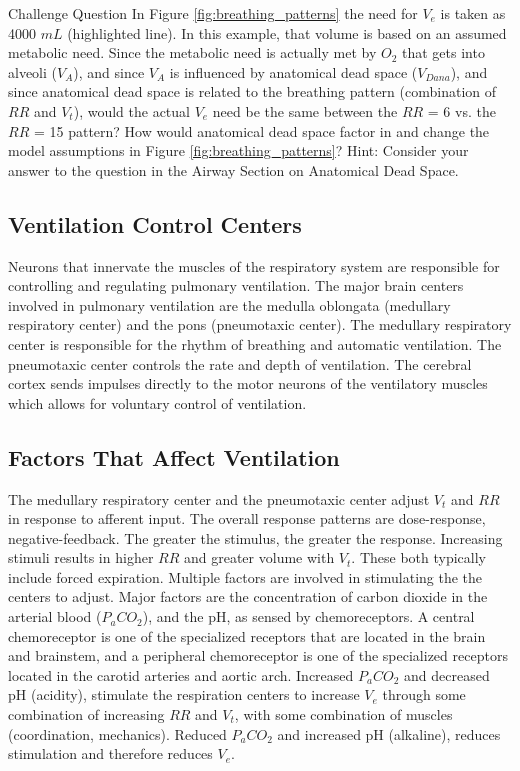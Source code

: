 \begin{question}{Challenge Question}
In Figure \ref{fig:breathing_patterns} the need for $V_e$ is taken as 4000 $mL$ (highlighted line). In this example, that volume is based on an assumed metabolic need. Since the metabolic need is actually met by $O_2$ that gets into alveoli ($V_A$), and since $V_A$ is influenced by anatomical dead space ($V_{Dana}$), and since anatomical dead space is related to the breathing pattern (combination of $RR$ and $V_t$), would the actual $V_e$ need be the same between the $RR$ = 6 vs. the $RR$ = 15 pattern? How would anatomical dead space factor in and change the model assumptions in Figure \ref{fig:breathing_patterns}? Hint: Consider your answer to the question in the Airway Section on Anatomical Dead Space.
\end{question}


\subsection{Ventilation Control Centers}

Neurons that innervate the muscles of the respiratory system are responsible for controlling and regulating pulmonary ventilation. The major brain centers involved in pulmonary ventilation are the medulla oblongata (medullary respiratory center) and the pons (pneumotaxic center). The medullary respiratory center is responsible for the rhythm of breathing and automatic ventilation. The pneumotaxic center controls the rate and depth of ventilation. The cerebral cortex sends impulses directly to the motor neurons of the ventilatory muscles which allows for voluntary control of ventilation.

\subsection{Factors That Affect Ventilation} 

The medullary respiratory center and the pneumotaxic center adjust $V_t$ and $RR$ in response to afferent input.  The overall response patterns are dose-response, negative-feedback. The greater the stimulus, the greater the response. Increasing stimuli results in higher $RR$ and greater volume with $V_t$. These both typically include forced expiration.  Multiple factors are involved in stimulating the the centers to adjust. Major factors are the concentration of carbon dioxide in the arterial blood ($P_aCO_2$), and the pH, as sensed by chemoreceptors. A central chemoreceptor is one of the specialized receptors that are located in the brain and brainstem, and a peripheral chemoreceptor is one of the specialized receptors located in the carotid arteries and aortic arch. Increased $P_aCO_2$ and decreased pH (acidity), stimulate the respiration centers to increase $V_e$ through some combination of increasing $RR$ and $V_t$, with some combination of muscles (coordination, mechanics). Reduced $P_aCO_2$ and increased pH (alkaline), reduces stimulation and therefore reduces $V_e$.

